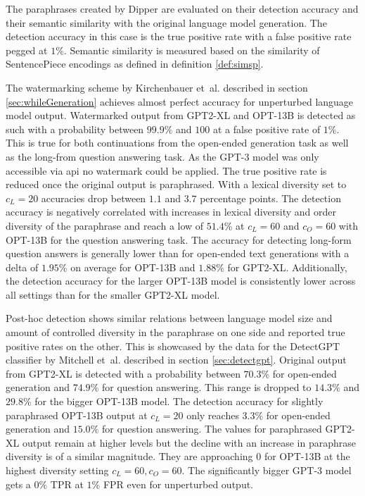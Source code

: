     The paraphrases created by Dipper are evaluated on their detection accuracy and their semantic similarity with the original language model generation.
    The detection accuracy in this case is the true positive rate with a false positive rate pegged at $1\%$.
    Semantic similarity is measured based on the similarity of SentencePiece encodings as defined in definition \ref{def:simsp}.

    The watermarking scheme by Kirchenbauer et~al. \cite{kirchenbauer2023watermark} described in section \ref{sec:whileGeneration} achieves almost perfect accuracy for unperturbed language model output.
    Watermarked output from GPT2-XL and OPT-13B is detected as such with a probability between $99.9\%$ and $100$ at a false positive rate of $1\%$.
    This is true for both continuations from the open-ended generation task as well as the long-from question answering task.
    As the GPT-3 model was only accessible via \ac{api} no watermark could be applied.
    The true positive rate is reduced once the original output is paraphrased.
    With a lexical diversity set to $c_L = 20$ accuracies drop between $1.1$ and $3.7$ percentage points.
    The detection accuracy is negatively correlated with increases in lexical diversity and order diversity of the paraphrase and reach a low of $51.4\%$ at $c_L=60$ and $c_O=60$ with OPT-13B for the question answering task.
    The accuracy for detecting long-form question answers is generally lower than for open-ended text generations with a delta of $1.95\%$ on average for OPT-13B and $1.88\%$ for GPT2-XL.
    Additionally, the detection accuracy for the larger OPT-13B model is consistently lower across all settings than for the smaller GPT2-XL model.

    Post-hoc detection shows similar relations between language model size and amount of controlled diversity in the paraphrase on one side and reported true positive rates on the other.
    This is showcased by the data for the DetectGPT classifier by Mitchell et~al. \cite{mitchell2023detectgpt} described in section \ref{sec:detectgpt}. 
    Original output from GPT2-XL is detected with a probability between $70.3\%$ for open-ended generation and $74.9\%$ for question answering.
    This range is dropped to $14.3\%$ and $29.8\%$ for the bigger OPT-13B model.
    The detection accuracy for slightly paraphrased OPT-13B output at $c_L=20$ only reaches $3.3\%$ for open-ended generation and $15.0\%$ for question answering.
    The values for paraphrased GPT2-XL output remain at higher levels but the decline with an increase in paraphrase diversity is of a similar magnitude.
    They are approaching $0$ for OPT-13B at the highest diversity setting $c_L=60,c_O=60$.
    The significantly bigger GPT-3 model gets a $0\%$ TPR at $1\%$ FPR even for unperturbed output.

